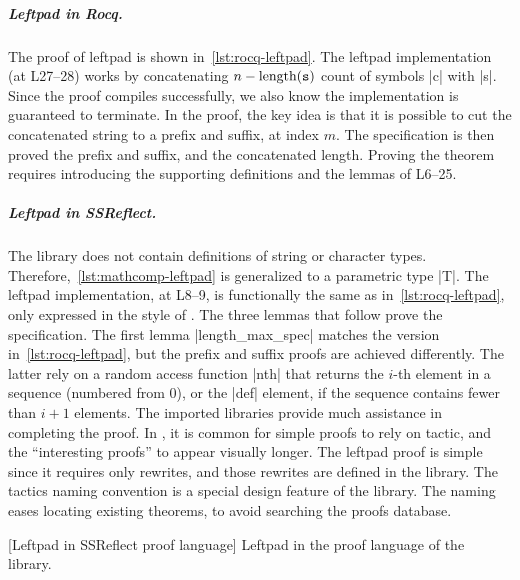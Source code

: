 \subparagraph*{Leftpad in Rocq.}
The  proof of leftpad is shown in~\autoref{lst:rocq-leftpad}. The
leftpad implementation (at L27--28) works by concatenating \(n -
\text{length}(\prm{s})\) count of  symbols \pr|c| with \pr|s|. Since the proof
compiles successfully, we also know the implementation is guaranteed to
terminate. In the proof, the key idea is that it is possible
to cut the concatenated string to a prefix and suffix, at index \(m\). The
specification is then proved \wrt the prefix and suffix,
and the concatenated length. Proving the theorem requires introducing the
supporting definitions and the lemmas of L6--25.

\subparagraph*{Leftpad in SSReflect.}
The  library does not contain definitions of string
or character types. Therefore,~\autoref{lst:mathcomp-leftpad} is generalized to
a parametric type \pr|T|. The leftpad implementation, at L8--9, is functionally
the same as in~\autoref{lst:rocq-leftpad}, only expressed in the style of
. The three lemmas that follow prove the specification. The first
lemma \pr|length_max_spec| matches the  version
in~\autoref{lst:rocq-leftpad}, but the prefix and suffix proofs are achieved
differently. The latter rely on a random access function \pr|nth| that returns
the \(i\)-th element in a sequence (numbered from 0), or the \pr|def| element,
if the sequence contains fewer than \(i+1\) elements. The imported libraries
provide much assistance in completing the proof. In , it is
common for simple proofs to rely on  tactic, and the
\enquote{interesting proofs} to appear visually longer. The leftpad proof is
simple since it requires only rewrites, and those rewrites are defined in the
library. The tactics naming convention is a special design feature of the
 library. The naming eases locating existing
theorems, to avoid searching the proofs database.

\begin{center}
\captionsetup{type=lstlisting}
\begin{minipage}{\linewidth}
[Leftpad in SSReflect proof language]{
   Leftpad in the  proof language of the  library.}
\label{lst:mathcomp-leftpad}
\end{minipage}
\end{center}


